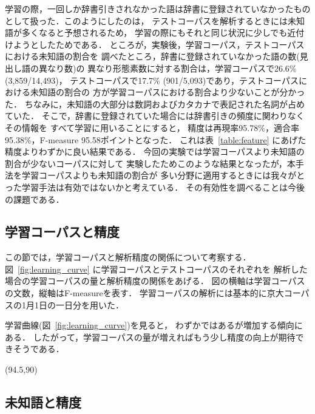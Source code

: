 学習の際，一回しか辞書引きされなかった語は辞書に登録されていなかったもの
として扱った．このようにしたのは，
テストコーパスを解析するときには未知語が多くなると予想されるため，
学習の際にもそれと同じ状況に少しでも近付けようとしたためである．
ところが，実験後，学習コーパス，テストコーパスにおける未知語の割合を
調べたところ，辞書に登録されていなかった語の数(見出し語の異なり数)の
異なり形態素数に対する割合は，学習コーパスで26.6\% (3,859/14,493)，
テストコーパスで17.7\% (901/5,093)であり，テストコーパスにおける未知語の割合の
方が学習コーパスにおける割合より少ないことが分かった．
ちなみに，未知語の大部分は数詞およびカタカナで表記された名詞が占めていた．
そこで，辞書に登録されていた場合には辞書引きの頻度に関わりなくその情報を
すべて学習に用いることにすると，
精度は再現率95.78\%，適合率95.38\%，F-measure 95.58ポイントとなった．
これは表~\ref{table:feature} にあげた精度よりわずかに良い結果である．
今回の実験では学習コーパスより未知語の割合が少ないコーパスに対して
実験したためこのような結果となったが，本手法を学習コーパスよりも未知語の割合が
多い分野に適用するときには我々がとった学習手法は有効ではないかと考えている．
その有効性を調べることは今後の課題である．

\subsection{学習コーパスと精度}
\label{sec:training_corpus_and_accuracy}

この節では，学習コーパスと解析精度の関係について考察する．
図~\ref{fig:learning_curve} に学習コーパスとテストコーパスのそれぞれを
解析した場合の学習コーパスの量と解析精度の関係をあげる．
図の横軸は学習コーパスの文数，縦軸はF-measureを表す．
学習コーパスの解析には基本的に京大コーパスの1月1日の一日分を用いた．

学習曲線(図~\ref{fig:learning_curve})を見ると，
わずかではあるが増加する傾向にある．
したがって，学習コーパスの量が増えればもう少し精度の向上が期待できそうである．

\begin{figure*}[htbp]
  \begin{center}
    \leavevmode
    \atari(94.5,90)
    \caption{学習コーパスの量と精度の関係}
    \label{fig:learning_curve}
  \end{center}
\end{figure*}

\subsection{未知語と精度}
\label{sec:unknown_words_and_accuracy}

